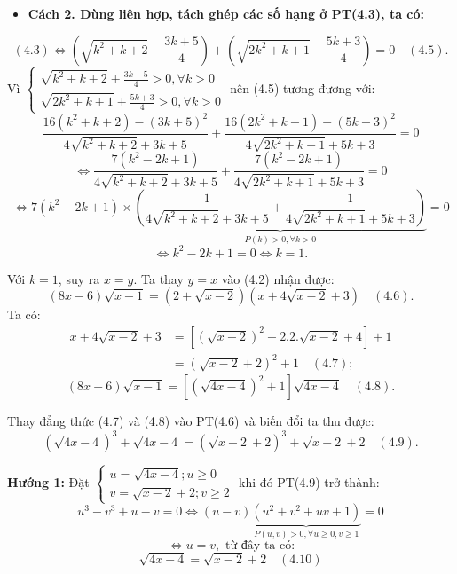 \documentclass[12pt]{report}
\begin{document}
\begin{itemize}
    \item \textbf{Cách 2. Dùng liên hợp, tách ghép các số hạng ở PT(4.3), ta có:}
\end{itemize}
\[
(4.3) \Leftrightarrow \left(\sqrt{k^2 + k + 2} - \frac{3k+5}{4}\right) + \left(\sqrt{2k^2 + k + 1} - \frac{5k+3}{4}\right) = 0 \quad (4.5).
\]
Vì $\begin{cases} \sqrt{k^2 + k + 2} + \frac{3k+5}{4} > 0, \forall k > 0 \\ \sqrt{2k^2 + k + 1} + \frac{5k+3}{4} > 0, \forall k > 0 \end{cases}$ nên (4.5) tương đương với:
\[
\frac{16(k^2 + k + 2) - (3k + 5)^2}{4\sqrt{k^2 + k + 2} + 3k + 5} + \frac{16(2k^2 + k + 1) - (5k + 3)^2}{4\sqrt{2k^2 + k + 1} + 5k + 3} = 0
\]
\[
\Leftrightarrow \frac{7(k^2 - 2k + 1)}{4\sqrt{k^2 + k + 2} + 3k + 5} + \frac{7(k^2 - 2k + 1)}{4\sqrt{2k^2 + k + 1} + 5k + 3} = 0
\]
\[
\Leftrightarrow 7(k^2 - 2k + 1) \times \underbrace{\left( \frac{1}{4\sqrt{k^2 + k + 2} + 3k + 5} + \frac{1}{4\sqrt{2k^2 + k + 1} + 5k + 3} \right)}_{P(k) > 0, \forall k > 0} = 0
\]
\[
\Leftrightarrow k^2 - 2k + 1 = 0 \Leftrightarrow k = 1.
\]

Với $k = 1$, suy ra $x = y$. Ta thay $y = x$ vào (4.2) nhận được:
\[
(8x - 6)\sqrt{x - 1} = (2 + \sqrt{x - 2})(x + 4\sqrt{x - 2} + 3) \quad (4.6).
\]
Ta có:
\begin{align*}
x + 4\sqrt{x - 2} + 3 &= [(\sqrt{x - 2})^2 + 2.2.\sqrt{x - 2} + 4] + 1 \\
&= (\sqrt{x - 2} + 2)^2 + 1 \quad (4.7);
\end{align*}
\[
(8x - 6)\sqrt{x - 1} = \left[ (\sqrt{4x - 4})^2 + 1 \right] \sqrt{4x - 4} \quad (4.8).
\]

Thay đẳng thức (4.7) và (4.8) vào PT(4.6) và biến đổi ta thu được:
\[
(\sqrt{4x - 4})^3 + \sqrt{4x - 4} = (\sqrt{x - 2} + 2)^3 + \sqrt{x - 2} + 2 \quad (4.9).
\]

\textbf{Hướng 1:} Đặt $\begin{cases} u = \sqrt{4x - 4}; u \ge 0 \\ v = \sqrt{x - 2} + 2; v \ge 2 \end{cases}$ khi đó PT(4.9) trở thành:
\[
u^3 - v^3 + u - v = 0 \Leftrightarrow (u - v) \underbrace{\left( u^2 + v^2 + uv + 1 \right)}_{P(u,v) > 0, \forall u \ge 0, v \ge 1} = 0
\]
\[
\Leftrightarrow u = v, \text{ từ đây ta có:}
\]
\[
\sqrt{4x - 4} = \sqrt{x - 2} + 2 \quad (4.10)
\]
\end{document}
